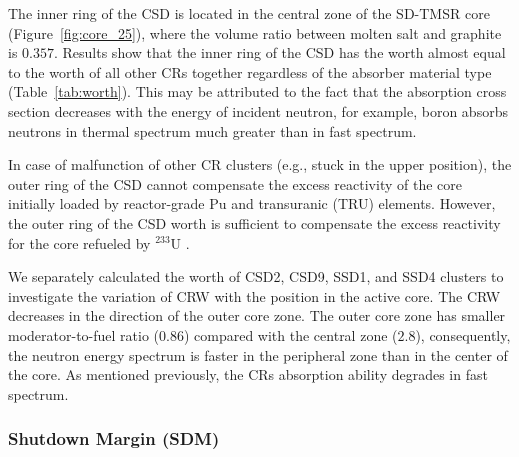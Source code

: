 The inner ring of the CSD is located in the central zone of the SD-TMSR core 
(Figure~\ref{fig:core_25}), where the volume ratio between molten salt and 
graphite is $0.357$. Results show that the inner ring of the CSD has 
the worth almost equal to the worth of all other CRs together regardless of 
the absorber material type (Table~\ref{tab:worth}). This may be attributed to 
the fact that the absorption cross section decreases with the energy of 
incident neutron, for example, boron absorbs neutrons in thermal spectrum much 
greater than in fast spectrum.

In case of malfunction of other CR clusters (e.g., stuck in the upper 
position), the outer ring of the CSD cannot compensate the excess 
reactivity of the core initially loaded by reactor-grade Pu and transuranic 
(TRU) elements. However, the outer ring of the CSD worth is sufficient 
to compensate the excess reactivity for the core refueled by $^{233}$U . 

We separately calculated the worth of CSD2, CSD9, SSD1, and SSD4 clusters to 
investigate the variation of CRW with the position in the active core.
The CRW decreases in the direction of the outer core zone. The outer core zone 
has smaller moderator-to-fuel ratio ($0.86$) compared with the central zone 
($2.8$), consequently, the neutron energy spectrum is faster in the peripheral 
zone than in the center of the core. As mentioned previously, the CRs 
absorption ability degrades in fast spectrum.

\subsubsection{Shutdown Margin (SDM)}

